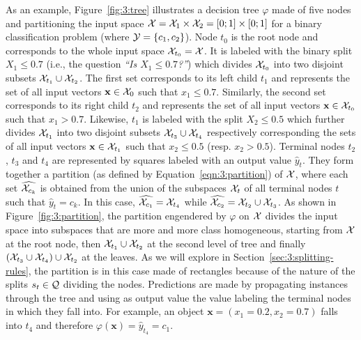 As an example, Figure~\ref{fig:3:tree} illustrates a decision tree $\varphi$
made of five nodes and partitioning the input space ${\cal X} = {\cal X}_1
\times {\cal X}_2 = [0;1] \times [0; 1]$ for a binary classification problem
(where ${\cal Y}=\{ c_1, c_2 \}$). Node $t_0$ is the root node and corresponds
to the whole input space ${\cal X}_{t_0} = {\cal X}$. It is labeled with the binary
split $X_1 \leq 0.7$ (i.e., the question \textit{``Is $X_1 \leq 0.7$?''}) which divides ${\cal X}_{t_0}$ into two disjoint subsets
${\cal X}_{t_1} \cup {\cal X}_{t_2}$. The first set corresponds to its left
child $t_1$ and represents the set of all input vectors $\mathbf{x} \in {\cal
X}_0$ such that $x_1 \leq 0.7$. Similarly, the second set corresponds to its
right child $t_2$ and represents the set of all input vectors $\mathbf{x} \in
{\cal X}_{t_0}$ such that $x_1 > 0.7$. Likewise, $t_1$ is labeled with the
split $X_2 \leq 0.5$ which further divides ${\cal X}_{t_1}$ into two disjoint
subsets ${\cal X}_{t_3} \cup {\cal X}_{t_4}$ respectively corresponding the
sets of all input vectors $\mathbf{x} \in {\cal X}_{t_1}$ such that $x_2 \leq
0.5$ (resp. $x_2 > 0.5$). Terminal nodes $t_2$, $t_3$ and $t_4$ are represented
by squares labeled with an output value $\widehat{y}_t$. They form together a
partition (as defined by Equation~\ref{eqn:3:partition}) of ${\cal X}$, where
each set $\widehat{{\cal X}_{c_k}}$ is obtained from the union of the subspaces
${\cal X}_t$ of all terminal nodes $t$ such that $\widehat{y}_t = c_k$. In this
case, $\widehat{{\cal X}_{c_1}} = {\cal X}_{t_4}$ while $\widehat{{\cal
X}_{c_2}} = {\cal X}_{t_2} \cup {\cal X}_{t_3}$. As shown in
Figure~\ref{fig:3:partition}, the partition engendered by  $\varphi$ on ${\cal
X}$ divides the input space into subspaces that are more and more class
homogeneous, starting from ${\cal X}$ at the root node,  then ${\cal X}_{t_1}
\cup {\cal X}_{t_2}$ at the second level of tree and finally $({\cal X}_{t_3}
\cup {\cal X}_{t_4})\cup {\cal X}_{t_2}$ at the leaves.  As we will explore in
Section~\ref{sec:3:splitting-rules}, the partition is in this case made of
rectangles because of the nature of the splits $s_t \in {\cal Q}$ dividing the nodes.
Predictions are made by propagating instances through the tree and using as
output value the value labeling the terminal nodes in which they fall
into. For example, an object $\mathbf{x}=(x_1=0.2, x_2=0.7)$ falls into $t_4$
and therefore $\varphi(\mathbf{x}) = \widehat{y}_{t_4} = c_1$.

